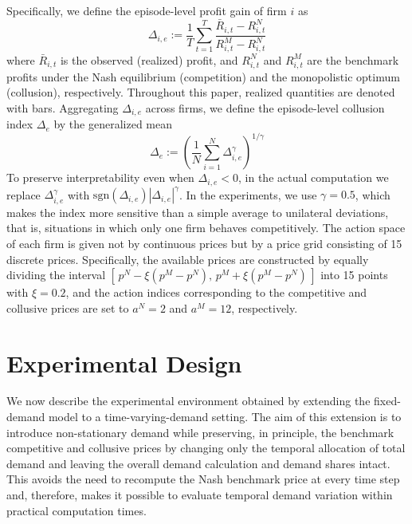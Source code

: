 \documentclass[runningheads]{llncs}
\begin{document}
Specifically, we define the episode-level profit gain of firm $i$ as
\begin{equation}
\Delta_{i,e}
:=
\frac{1}{T}\sum_{t=1}^{T}
\frac{\bar{R}_{i,t}-R^N_{i,t}}{R^M_{i,t}-R^N_{i,t}}
\label{eq:episodic_profit_gain}
\end{equation}
where $\bar{R}_{i,t}$ is the observed (realized) profit, and $R^N_{i,t}$ and $R^M_{i,t}$ are the benchmark profits under the Nash equilibrium (competition) and the monopolistic optimum (collusion), respectively.
Throughout this paper, realized quantities are denoted with bars.
Aggregating $\Delta_{i,e}$ across firms, we define the episode-level collusion index $\Delta_e$ by the generalized mean
\begin{equation}
\Delta_{e}
:=
\left(\frac{1}{N}\sum_{i=1}^{N}\Delta_{i,e}^{\gamma}\right)^{1/\gamma}
\label{eq:collusion_index}
\end{equation}
To preserve interpretability even when $\Delta_{i,e}<0$, in the actual computation we replace $\Delta_{i,e}^{\gamma}$ with $\mathrm{sgn}(\Delta_{i,e})|\Delta_{i,e}|^{\gamma}$.
In the experiments, we use $\gamma=0.5$, which makes the index more sensitive than a simple average to unilateral deviations, that is, situations in which only one firm behaves competitively.
The action space of each firm is given not by continuous prices but by a price grid consisting of 15 discrete prices.
Specifically, the available prices are constructed by equally dividing the interval $[\,p^N-\xi(p^M-p^N),\,p^M+\xi(p^M-p^N)\,]$ into 15 points with $\xi=0.2$, and the action indices corresponding to the competitive and collusive prices are set to $a^N=2$ and $a^M=12$, respectively.


\section{Experimental Design}
\label{sec:method_timevarying_lambda}

We now describe the experimental environment obtained by extending the fixed-demand model to a time-varying-demand setting.
The aim of this extension is to introduce non-stationary demand while preserving, in principle, the benchmark competitive and collusive prices by changing only the temporal allocation of total demand and leaving the overall demand calculation and demand shares intact.
This avoids the need to recompute the Nash benchmark price at every time step and, therefore, makes it possible to evaluate temporal demand variation within practical computation times.
\end{document}
